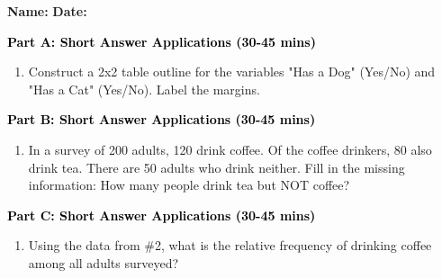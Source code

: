 \documentclass[12pt, letterpaper, fleqn]{article}
\begin{document}
\textbf{Name:} \underline{\hspace{5cm}}
\hfill
\textbf{Date:} \underline{\hspace{3cm}}\\


\begin{tcolorbox}[colback=customteal!20]
\large\textcolor{black}{\textbf{Part A: Short Answer Applications (30-45 mins)}}
\end{tcolorbox}

\vspace{3mm}

\begin{enumerate}[itemsep=4.2cm, leftmargin=0.6cm]
\item Construct a 2x2 table outline for the variables "Has a Dog" (Yes/No) and "Has a Cat" (Yes/No). Label the margins.
\end{enumerate}

\newpage

\begin{tcolorbox}[colback=customteal!20]
\large\textcolor{black}{\textbf{Part B: Short Answer Applications (30-45 mins)}}
\end{tcolorbox}

\vspace{3mm}

\begin{enumerate}[itemsep=4.2cm, leftmargin=0.6cm, resume]
\item In a survey of 200 adults, 120 drink coffee. Of the coffee drinkers, 80 also drink tea. There are 50 adults who drink neither. Fill in the missing information: How many people drink tea but NOT coffee?
\end{enumerate}

\newpage

\begin{tcolorbox}[colback=customteal!20]
\large\textcolor{black}{\textbf{Part C: Short Answer Applications (30-45 mins)}}
\end{tcolorbox}

\vspace{3mm}

\begin{enumerate}[itemsep=4.2cm, leftmargin=0.6cm, resume]
\item Using the data from \#2, what is the relative frequency of drinking coffee among all adults surveyed?
\end{enumerate}
\end{document}
